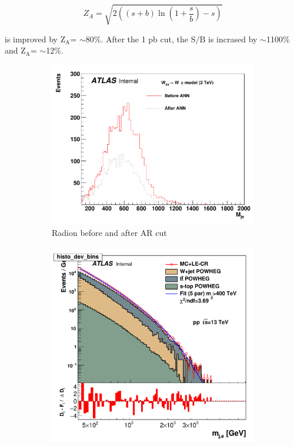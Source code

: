 \begin{equation}\label{eq:app:1.1}
    Z_A = \sqrt{2 \left(  (s+b)\ln \left( 1+\frac{s}{b} \right) -s \right)}
\end{equation}

is improved by $\textrm{Z}_{\textrm{A}}$= $\sim$80\%. After the 1 pb cut, the $\textrm{S}/\textrm{B}$ is incrased by $\sim$1100\% and $\textrm{Z}_{\textrm{A}}$= $\sim$12\%. 

\begin{figure}[H]
    \centering
    \begin{subfigure}[h]{0.32\linewidth}
    \includegraphics[scale=0.3]{figs/ch6/ar/mass_radion.pdf}%
    \caption{Radion before and after AR cut}
    \end{subfigure}
    \hfill
    \begin{subfigure}[h]{0.28\linewidth}
    \includegraphics[scale=0.25]{figs/ch6/ar/mass_je_mcCR_before_scale.pdf}%

\end{subfigure}
\end{figure}
